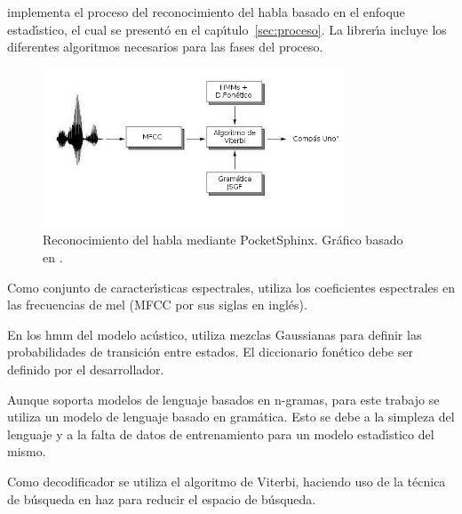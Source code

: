  implementa el proceso del reconocimiento del habla basado en el enfoque estad{\'\i}stico,
el cual se present\'o en el cap{\'\i}tulo~\ref{sec:proceso}. La librer{\'\i}a incluye los diferentes algoritmos
necesarios para las fases del proceso.

\begin{figure}[H] 
\centering
\includegraphics[width=0.8\textwidth]{./graphics/pocketsphinx.png}
\caption{Reconocimiento del habla mediante PocketSphinx. Gr\'afico basado en \cite{VerenichASR}.}
\label{figure:proceso-pocketsphinx}
\end{figure}

Como conjunto de caracter{\'\i}sticas espectrales,  utiliza los coeficientes espectrales
en las frecuencias de mel (MFCC por sus siglas en ingl\'es).

En los \gls{hmm} del modelo ac\'ustico, utiliza mezclas Gaussianas para definir las probabilidades de 
transici\'on entre estados. El diccionario fon\'etico debe ser definido por el desarrollador.

Aunque  soporta modelos de lenguaje basados en n-gramas, para este trabajo se utiliza
un modelo de lenguaje basado en gram\'atica. Esto se debe a la simpleza del lenguaje y a la falta de datos
de entrenamiento para un modelo estad{\'\i}stico del mismo.

Como decodificador se utiliza el algoritmo de Viterbi, haciendo uso de la t\'ecnica de b\'usqueda en haz
para reducir el espacio de b\'usqueda.
